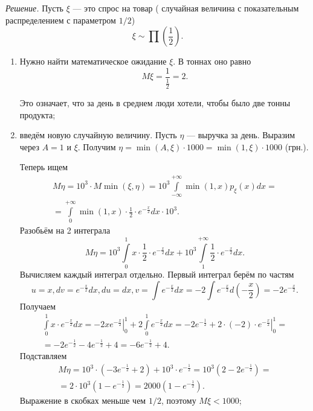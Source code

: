 \textit{Решение.} Пусть $ \xi $ --- это спрос на товар ( случайная величина с показательным распределением с параметром $1/2$)
$$ \xi \sim \prod \left( \frac{1}{2} \right).$$

\begin{enumerate}[label=\alph*)]
\item Нужно найти математическое ожидание $ \xi $.
В тоннах оно равно
$$M \xi =
\frac{1}{ \frac{1}{2}} =
2.$$

Это означает, что за день в среднем люди хотели, чтобы было две тонны продукта;
\item введём новую случайную величину.
Пусть $ \eta $ --- выручка за день.
Выразим через $A = 1$ и $ \xi $.
Получим $ \eta = \min \left( A, \xi \right) \cdot 1000 = \min \left( 1, \xi \right) \cdot 1000$ (грн.).

Теперь ищем
\begin{equation*}
\begin{split}
M \eta =
10^3 \cdot M \min \left( \xi, \eta \right) =
10^3 \int \limits_{- \infty }^{+ \infty } \min \left( 1, x \right) p_{ \xi } \left( x \right) dx = \\
= \int \limits_0^{+ \infty } \min \left( 1, x \right) \cdot \frac{1}{2} \cdot e^{- \frac{x}{2}} dx \cdot 10^3.
\end{split}
\end{equation*}
Разобьём на 2 интеграла
$$M \eta =
10^3 \int \limits_0^1 x \cdot \frac{1}{2} \cdot e^{- \frac{x}{2}} dx + 10^3 \int \limits_1^{+ \infty } \frac{1}{2} \cdot e^{- \frac{x}{2}} dx.$$
Вычисляем каждый интеграл отдельно.
Первый интеграл берём по частям
$$u = x, dv = e^{- \frac{x}{2}} dx, du = dx, v = \int e^{- \frac{x}{2}} dx = -2 \int e^{- \frac{x}{2}} d \left( - \frac{x}{2} \right) = -2e^{- \frac{x}{2}}.$$
Получаем
\begin{equation*}
\begin{split}
\int \limits_0^1 x \cdot e^{- \frac{x}{2}} dx =
\left. -2xe^{- \frac{x}{2}} \right|_0^1 + 2 \int \limits_0^1 e^{- \frac{x}{2}} dx =
\left. -2e^{- \frac{1}{2}} + 2 \cdot \left( -2 \right) \cdot e^{- \frac{x}{2}} \right|_0^1 = \\
= -2e^{- \frac{1}{2}} -4e^{- \frac{1}{2}} + 4 =
-6e^{- \frac{1}{2}} + 4.
\end{split}
\end{equation*}
Подставляем
\begin{equation*}
\begin{split}
M \eta =
10^3 \cdot \left( -3e^{- \frac{1}{2}} + 2 \right) + 10^3 \cdot e^{- \frac{1}{2}} =
10^3 \left( 2 - 2e^{- \frac{1}{2}} \right) = \\
= 2 \cdot 10^3 \left( 1 - e^{- \frac{1}{2}} \right) =
2000 \left( 1 - e^{- \frac{1}{2}} \right).
\end{split}
\end{equation*}
Выражение в скобках меньше чем $1/2$, поэтому $M \xi < 1000$;


\end{enumerate}

